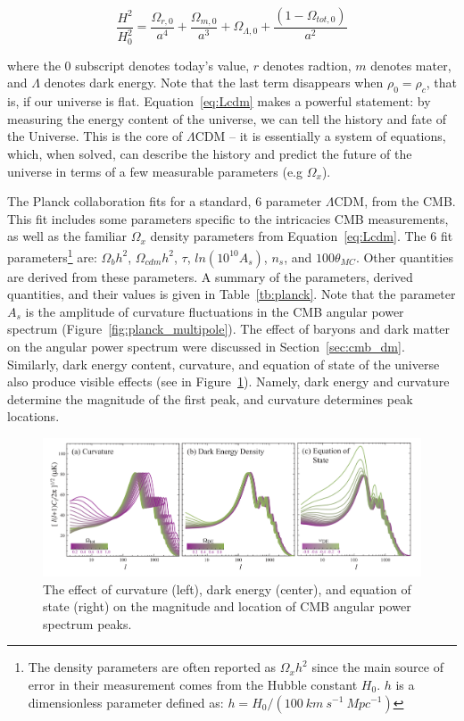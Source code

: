 \begin{equation}
\label{eq:Lcdm}
\frac{H^{2}}{H_{0}^{2}} = \frac{\Omega_{r, 0}}{a^{4}} + \frac{\Omega_{m, 0}}{a^{3}} + \Omega_{\Lambda, 0} + \frac{( 1 - \Omega_{tot,0})}{a^{2}} 
\end{equation}
  
where the $0$ subscript denotes today's value, $r$ denotes radtion, $m$ denotes mater, and $\Lambda$ denotes dark energy. Note that the last term disappears when $\rho_{0} = \rho_{c}$, that is, if our universe is flat. Equation~\ref{eq:Lcdm} makes a powerful statement: by measuring the energy content of the universe, we can tell the history and fate of the Universe. This is the core of $\Lambda$\ac{CDM} -- it is essentially a system of equations, which, when solved, can describe the history and predict the future of the universe in terms of a few measurable parameters (e.g $\Omega_{x}$). 

The Planck collaboration fits for a standard, 6 parameter $\Lambda$\ac{CDM}, from the \ac{CMB}. This fit includes some parameters specific to the intricacies \ac{CMB} measurements, as well as the familiar $\Omega_{x}$ density parameters from Equation~\ref{eq:Lcdm}. The 6 fit parameters\footnote{ The density parameters are often reported as $\Omega_{x}h^{2}$ since the main source of error in their measurement comes from the Hubble constant $H_{0}$. $h$ is a dimensionless parameter defined as: $h = H_{0}/( 100~km~s^{-1}~Mpc^{-1})$} are:  $\Omega_{b}h^{2}$, $\Omega_{cdm}h^{2}$, $\tau$, $ln(10^{10}A_{s})$, $n_{s}$, and $100\theta_{MC}$. Other quantities are derived from these parameters. A summary of the parameters, derived quantities, and their values is given in Table~\ref{tb:planck}. Note that the parameter $A_{s}$ is the amplitude of curvature fluctuations in the \ac{CMB} angular power spectrum (Figure~\ref{fig:planck_multipole}). The effect of baryons and dark matter on the angular power spectrum were discussed in Section~\ref{sec:cmb_dm}. Similarly, dark energy content, curvature, and equation of state of the universe also produce visible effects (see in Figure~\ref{fig:curve_etc}). Namely, dark energy and curvature determine the magnitude of the first peak, and curvature determines peak locations.

\begin{figure}[htbp]
\begin{center}
\includegraphics[width=\textwidth]{figures/theory/curve_etc.png}
\caption{The effect of curvature (left), dark energy (center), and equation of state (right) on the magnitude and location of \ac{CMB} angular power spectrum peaks.  \cite{Hu2008} }
\label{fig:curve_etc}
\end{center}
\end{figure}

